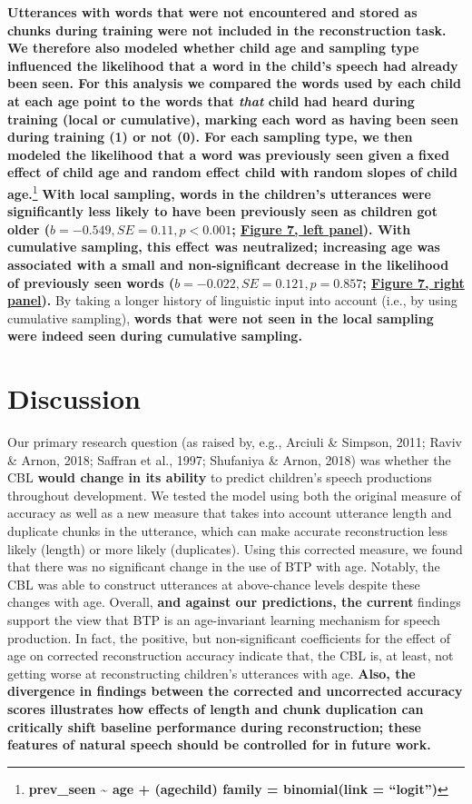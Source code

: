 \documentclass[man,mask,floatsintext]{apa6}
\let\rmarkdownfootnote\footnote%
\def\footnote{\protect\rmarkdownfootnote}
\begin{document}
\textbf{Utterances with words that were not encountered and stored as
chunks during training were not included in the reconstruction task. We
therefore also modeled whether child age and sampling type influenced
the likelihood that a word in the child's speech had already been seen.
For this analysis we compared the words used by each child at each age
point to the words that \emph{that} child had heard during training
(local or cumulative), marking each word as having been seen during
training (1) or not (0). For each sampling type, we then modeled the
likelihood that a word was previously seen given a fixed effect of child
age and random effect child with random slopes of child age.}\footnote{\textbf{prev\_seen
  \textasciitilde{} age + (age\textbar{}child) family = binomial(link =
  \enquote{logit})}} \textbf{With local sampling, words in the
children's utterances were significantly less likely to have been
previously seen as children got older
(\(b = -0.549, SE = 0.11, p < 0.001\); \protect\hyperlink{fig7}{Figure
7, left panel}). With cumulative sampling, this effect was neutralized;
increasing age was associated with a small and non-significant decrease
in the likelihood of previously seen words
(\(b = -0.022, SE = 0.121, p = 0.857\); \protect\hyperlink{fig7}{Figure
7, right panel}).} By taking a longer history of linguistic input into
account (i.e., by using cumulative sampling), \textbf{words that were
not seen in the local sampling were indeed seen during cumulative
sampling.}

\section{Discussion}\label{discussion}

Our primary research question (as raised by, e.g., Arciuli \& Simpson,
2011; Raviv \& Arnon, 2018; Saffran et al., 1997; Shufaniya \& Arnon,
2018) was whether the CBL \textbf{would change in its ability} to
predict children's speech productions throughout development. We tested
the model using both the original measure of accuracy as well as a new
measure that takes into account utterance length and duplicate chunks in
the utterance, which can make accurate reconstruction less likely
(length) or more likely (duplicates). Using this corrected measure, we
found that there was no significant change in the use of BTP with age.
Notably, the CBL was able to construct utterances at above-chance levels
despite these changes with age. Overall, \textbf{and against our
predictions, the current} findings support the view that BTP is an
age-invariant learning mechanism for speech production. In fact, the
positive, but non-significant coefficients for the effect of age on
corrected reconstruction accuracy indicate that, the CBL is, at least,
not getting worse at reconstructing children's utterances with age.
\textbf{Also, the divergence in findings between the corrected and
uncorrected accuracy scores illustrates how effects of length and chunk
duplication can critically shift baseline performance during
reconstruction; these features of natural speech should be controlled
for in future work.}
\end{document}
